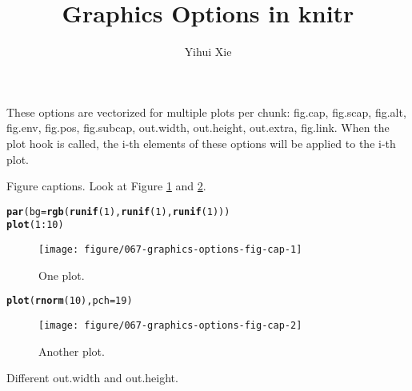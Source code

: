 \documentclass{article}\usepackage[]{graphicx}\usepackage[]{xcolor}
\title{Graphics Options in knitr}
\author{Yihui Xie}
\makeatletter
\newcommand{\hlnum}[1]{\textcolor[rgb]{0.686,0.059,0.569}{#1}}%
\newcommand{\hlopt}[1]{\textcolor[rgb]{0,0,0}{#1}}%
\newcommand{\hlstd}[1]{\textcolor[rgb]{0.345,0.345,0.345}{#1}}%
\newcommand{\hlkwc}[1]{\textcolor[rgb]{0.333,0.667,0.333}{#1}}%
\newcommand{\hlkwd}[1]{\textcolor[rgb]{0.737,0.353,0.396}{\textbf{#1}}}%
\newenvironment{kframe}{%
 \def\at@end@of@kframe{}%
 \ifinner\ifhmode%
  \def\at@end@of@kframe{\end{minipage}}%
  \begin{minipage}{\columnwidth}%
 \fi\fi%
 \def\FrameCommand##1{\hskip\@totalleftmargin \hskip-\fboxsep
 \colorbox{shadecolor}{##1}\hskip-\fboxsep
     \hskip-\linewidth \hskip-\@totalleftmargin \hskip\columnwidth}%
 \MakeFramed {\advance\hsize-\width
   \@totalleftmargin\z@ \linewidth\hsize
   \@setminipage}}%
 {\par\unskip\endMakeFramed%
 \at@end@of@kframe}
\newenvironment{knitrout}{}{} %
\makeatother
\begin{document}
\maketitle



These options are vectorized for multiple plots per chunk: fig.cap, fig.scap, fig.alt, fig.env, fig.pos, fig.subcap, out.width, out.height, out.extra, fig.link.
When the plot hook is called, the i-th elements of these options will be
applied to the i-th plot.

Figure captions. Look at Figure \ref{fig:fig-cap-1} and \ref{fig:fig-cap-2}.

\begin{knitrout}
\color{fgcolor}\begin{kframe}
\begin{alltt}
\hlkwd{par}\hlstd{(}\hlkwc{bg} \hlstd{=} \hlkwd{rgb}\hlstd{(}\hlkwd{runif}\hlstd{(}\hlnum{1}\hlstd{),} \hlkwd{runif}\hlstd{(}\hlnum{1}\hlstd{),} \hlkwd{runif}\hlstd{(}\hlnum{1}\hlstd{)))}
\hlkwd{plot}\hlstd{(}\hlnum{1}\hlopt{:}\hlnum{10}\hlstd{)}
\end{alltt}
\end{kframe}\begin{figure}[H]
\texttt{[image: figure/067-graphics-options-fig-cap-1]} \caption[One plot]{One plot.}\label{fig:fig-cap-1}
\end{figure}

\begin{kframe}\begin{alltt}
\hlkwd{plot}\hlstd{(}\hlkwd{rnorm}\hlstd{(}\hlnum{10}\hlstd{),} \hlkwc{pch} \hlstd{=} \hlnum{19}\hlstd{)}
\end{alltt}
\end{kframe}\begin{figure}[H]
\texttt{[image: figure/067-graphics-options-fig-cap-2]} \caption[Another plot]{Another plot.}\label{fig:fig-cap-2}
\end{figure}

\end{knitrout}

Different out.width and out.height.
\end{document}
